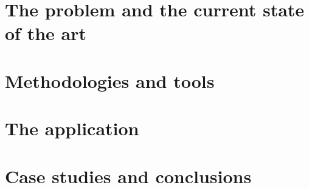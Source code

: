 \documentclass[
10pt, %
oneside, %
english, %
doublespacing, %
headsepline, %
]{MastersDoctoralThesis} %
\begin{document}

\mainmatter %

\pagestyle{thesis} %

\part{The problem and the current state of the art}

\part{Methodologies and tools}

\part{The application}

\part{Case studies and conclusions}





%
%
%


\printbibliography
\end{document}
